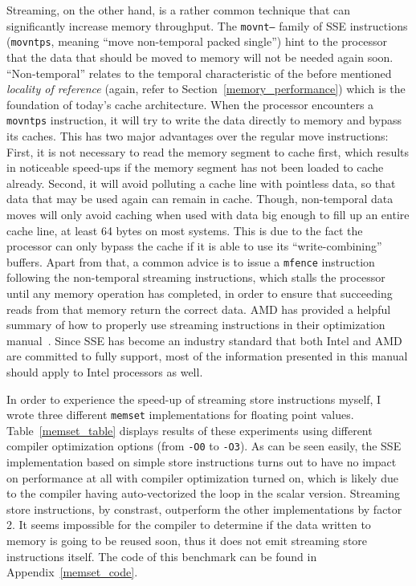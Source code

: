 Streaming, on the other hand, is a rather common technique that can significantly increase memory throughput. The \texttt{movnt--} family of SSE instructions (\eg \texttt{movntps}, meaning ``move non-temporal packed single'') hint to the processor that the data that should be moved to memory will not be needed again soon. ``Non-temporal'' relates to the temporal characteristic of the before mentioned \emph{locality of reference} (again, refer to Section~\ref{memory_performance}) which is the foundation of today's cache architecture. When the processor encounters a \texttt{movntps} instruction, it will try to write the data directly to memory and bypass its caches. This has two major advantages over the regular move instructions: First, it is not necessary to read the memory segment to cache first, which results in noticeable speed-ups if the memory segment has not been loaded to cache already. Second, it will avoid polluting a cache line with pointless data, so that data that may be used again can remain in cache. Though, non-temporal data moves will only avoid caching when used with data big enough to fill up an entire cache line, \ie{}at least 64 bytes on most systems. This is due to the fact the processor can only bypass the cache if it is able to use its ``write-combining'' buffers. Apart from that, a common advice is to issue a \texttt{mfence} instruction following the non-temporal streaming instructions, which stalls the processor until any memory operation has completed, in order to ensure that succeeding reads from that memory return the correct data. AMD has provided a helpful summary of how to properly use streaming instructions in their optimization manual~\cite[pp. 106ff, 231ff]{amd2012optimization}. Since SSE has become an industry standard that both Intel and AMD are committed to fully support, most of the information presented in this manual should apply to Intel processors as well.

In order to experience the speed-up of streaming store instructions myself, I wrote three different \texttt{memset} implementations for floating point values. Table~\ref{memset_table} displays results of these experiments using different compiler optimization options (from \texttt{-O0} to \texttt{-O3}). As can be seen easily, the SSE implementation based on simple store instructions turns out to have no impact on performance at all with compiler optimization turned on, which is likely due to the compiler having auto-vectorized the loop in the scalar version. Streaming store instructions, by constrast, outperform the other implementations by factor 2. It seems impossible for the compiler to determine if the data written to memory is going to be reused soon, thus it does not emit streaming store instructions itself. The code of this benchmark can be found in Appendix~\ref{memset_code}.

